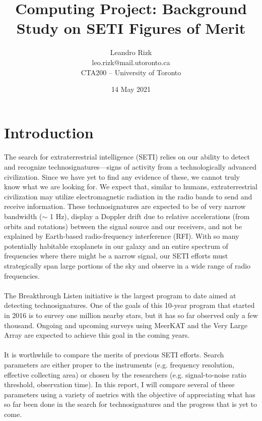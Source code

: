 \documentclass{article}
\author{Leandro Rizk \\ leo.rizk@mail.utoronto.ca \\ CTA200 -- University of Toronto}
\title{Computing Project: Background Study on SETI Figures of Merit}
\date{14 May 2021}
\begin{document}
\maketitle




\section{Introduction}



\paragraph{}
The search for extraterrestrial intelligence (SETI) relies on our ability to detect and recognize technosignatures---signs of activity from a technologically advanced civilization. Since we have yet to find any evidence of these, we cannot truly know what we are looking for. We expect that, similar to humans, extraterrestrial civilization may utilize electromagnetic radiation in the radio bands to send and receive information. These technosignatures are expected to be of very narrow bandwidth ($\sim$ 1 Hz), display a Doppler drift due to relative accelerations (from orbits and rotations) between the signal source and our receivers, and not be explained by Earth-based radio-frequency interference (RFI). With so many potentially habitable exoplanets in our galaxy and an entire spectrum of frequencies where there might be a narrow signal, our SETI efforts must strategically span large portions of the sky and observe in a wide range of radio frequencies.

\paragraph{}
The Breakthrough Listen initiative is the largest program to date aimed at detecting technosignatures. One of the goals of this 10-year program that started in 2016 is to survey one million nearby stars, but it has so far observed only a few thousand. Ongoing and upcoming surveys using MeerKAT and the Very Large Array are expected to achieve this goal in the coming years.

\paragraph{}
It is worthwhile to compare the merits of previous SETI efforts. Search parameters are either proper to the instruments (e.g. frequency resolution, effective collecting area) or chosen by the researchers (e.g. signal-to-noise ratio threshold, observation time). In this report, I will compare several of these parameters using a variety of metrics with the objective of appreciating what has so far been done in the search for technosignatures and the progress that is yet to come.
\end{document}
